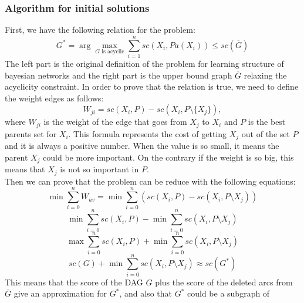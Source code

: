\subsubsection{Algorithm for initial solutions}
\label{subsub:fasalgorithm}
	First, we have the following relation for the problem:
		\begin{equation}
			\label{eq:reduction}
			G^* = \arg\max_{G \text{ is acyclic}} \sum_{i=1}^n {sc}( X_i , {Pa}( X_i ) ) \leq {sc}(\overline{G})
		\end{equation}
	The left part is the original definition of the problem for learning structure of bayesian networks and the right part is the upper bound graph $\overline{G}$ relaxing the acyclicity constraint. In order to prove that the relation is true, we need to define the weight edges as follows:
		\begin{equation}
			\label{eq:weight}
			W_{ji} = {sc}( X_i , P ) - {sc}( X_i , P \setminus \{ X_j \} ) ,
		\end{equation}
	where $W_{ji}$ is the weight of the edge that goes from $X_j$ to $X_i$ and $P$ is the best parents set for $X_i$. This formula represents the cost of getting $X_j$ out of the set $P$ and it is always a positive number. When the value is so small, it means the parent $X_j$ could be more important. On the contrary if the weight is so big, this means that $X_j$ is not so important in $P$.\\
	Then we can prove that the problem can be reduce with the following equations:
	\begin{equation}
		\label{eq:prove1}
		\min \sum_{i=0}^{n} W_{uv} = \min \sum_{i=0}^{n} ( {sc}( X_i , P ) - {sc}( X_i , P \setminus X_j ) )
	\end{equation}
	\begin{equation}
		\label{eq:prove2}
		\min \sum_{i=0}^{n} {sc}( X_i , P ) - \min \sum_{i=0}^{n} {sc}( X_i , P \setminus X_j )
	\end{equation}
	\begin{equation}
		\label{eq:prove3}
		\max \sum_{i=0}^{n} {sc}( X_i , P ) + \min \sum_{i=0}^{n} {sc}( X_i , P \setminus X_j )
	\end{equation}
	\begin{equation}
		\label{eq:prove4}
		{sc}( G ) + \min \sum_{i=0}^{n} {sc}( X_i , P \setminus X_j ) \approx {sc}( G^* )
	\end{equation}
        This means that the score of the DAG $G$ plus the score of the
        deleted arcs from $\overline{G}$ give an approximation for
        $G^*$, and also that $G^*$ could be a subgraph of
